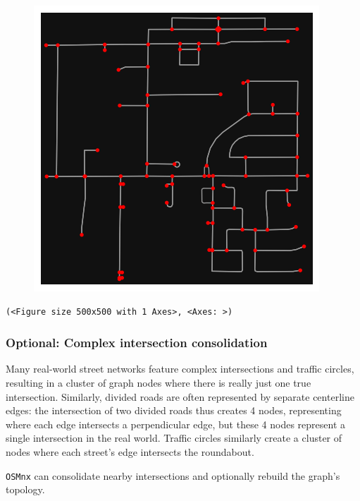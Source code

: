 \documentclass[
  letterpaper,
  DIV=11,
  numbers=noendperiod]{scrreprt}
\begin{document}
\begin{figure}[H]

{\centering \includegraphics{labs/w07_OSM_files/figure-pdf/cell-17-output-1.png}

}

\end{figure}

\begin{verbatim}
(<Figure size 500x500 with 1 Axes>, <Axes: >)
\end{verbatim}

\hypertarget{optional-complex-intersection-consolidation}{%
\subsubsection{Optional: Complex intersection
consolidation}\label{optional-complex-intersection-consolidation}}

Many real-world street networks feature complex intersections and
traffic circles, resulting in a cluster of graph nodes where there is
really just one true intersection. Similarly, divided roads are often
represented by separate centerline edges: the intersection of two
divided roads thus creates 4 nodes, representing where each edge
intersects a perpendicular edge, but these 4 nodes represent a single
intersection in the real world. Traffic circles similarly create a
cluster of nodes where each street's edge intersects the roundabout.

\texttt{OSMnx} can consolidate nearby intersections and optionally
rebuild the graph's topology.
\end{document}
